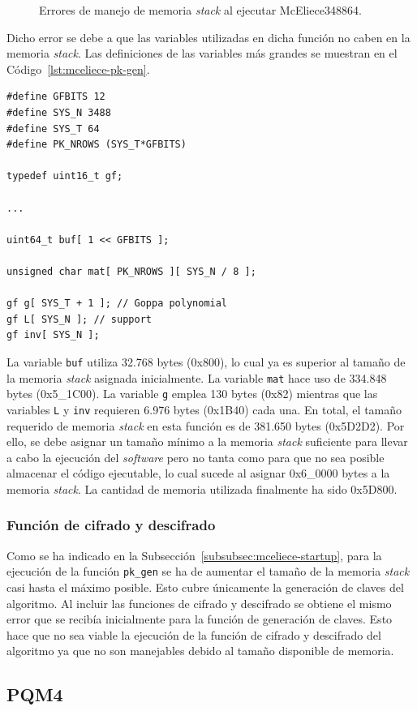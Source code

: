 \begin{figure}[h]
\begin{subfigure}[b]{0.3\textwidth}
    \end{subfigure}
       \caption{Errores de manejo de memoria \textit{stack} al ejecutar McEliece348864.}
       \label{fig:mceliece-error}
\end{figure}

Dicho error se debe a que las variables utilizadas en dicha función no caben en la memoria \textit{stack}.
Las definiciones de las variables más grandes se muestran en el Código~\ref{lst:mceliece-pk-gen}.

\begin{lstlisting}[label={lst:mceliece-pk-gen},style=Cnice,firstnumber=1,caption={Variables en la función \texttt{pk\_gen}.}]
#define GFBITS 12
#define SYS_N 3488
#define SYS_T 64
#define PK_NROWS (SYS_T*GFBITS)

typedef uint16_t gf;

...

uint64_t buf[ 1 << GFBITS ];

unsigned char mat[ PK_NROWS ][ SYS_N / 8 ];

gf g[ SYS_T + 1 ]; // Goppa polynomial
gf L[ SYS_N ]; // support
gf inv[ SYS_N ];
\end{lstlisting}

La variable \texttt{buf} utiliza 32.768 bytes (0x800), lo cual ya es superior al tamaño de la memoria \textit{stack} asignada inicialmente.
La variable \texttt{mat} hace uso de 334.848 bytes (0x5\_1C00).
La variable \texttt{g} emplea 130 bytes (0x82) mientras que las variables \texttt{L} y \texttt{inv} requieren 6.976 bytes (0x1B40) cada una.
En total, el tamaño requerido de memoria \textit{stack} en esta función es de 381.650 bytes (0x5D2D2).
Por ello, se debe asignar un tamaño mínimo a la memoria \textit{stack} suficiente para llevar a cabo la ejecución del \textit{software} pero no tanta como para que no sea posible almacenar el código ejecutable, lo cual sucede al asignar 0x6\_0000 bytes a la memoria \textit{stack}.
La cantidad de memoria utilizada finalmente ha sido 0x5D800.


\subsubsection{Función de cifrado y descifrado}\label{subsubsec:mceliece-dec-enc}

Como se ha indicado en la Subsección~\ref{subsubsec:mceliece-startup}, para la ejecución de la función \texttt{pk\_gen} se ha de aumentar el tamaño de la memoria \textit{stack} casi hasta el máximo posible.
Esto cubre únicamente la generación de claves del algoritmo.
Al incluir las funciones de cifrado y descifrado se obtiene el mismo error que se recibía inicialmente para la función de generación de claves.
Esto hace que no sea viable la ejecución de la función de cifrado y descifrado del algoritmo ya que no son manejables debido al tamaño disponible de memoria.


\subsection{PQM4}\label{subsec:pqm4}




